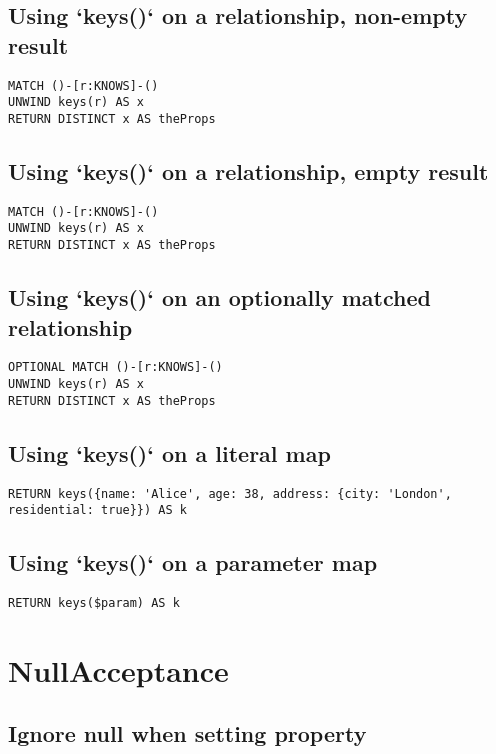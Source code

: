 \subsection{Using `keys()` on a relationship, non-empty result}

\begin{lstlisting}
MATCH ()-[r:KNOWS]-()
UNWIND keys(r) AS x
RETURN DISTINCT x AS theProps
\end{lstlisting}

\subsection{Using `keys()` on a relationship, empty result}

\begin{lstlisting}
MATCH ()-[r:KNOWS]-()
UNWIND keys(r) AS x
RETURN DISTINCT x AS theProps
\end{lstlisting}

\subsection{Using `keys()` on an optionally matched relationship}

\begin{lstlisting}
OPTIONAL MATCH ()-[r:KNOWS]-()
UNWIND keys(r) AS x
RETURN DISTINCT x AS theProps
\end{lstlisting}

\subsection{Using `keys()` on a literal map}

\begin{lstlisting}
RETURN keys({name: 'Alice', age: 38, address: {city: 'London', residential: true}}) AS k
\end{lstlisting}

\subsection{Using `keys()` on a parameter map}

\begin{lstlisting}
RETURN keys($param) AS k
\end{lstlisting}
\section{NullAcceptance}


\subsection{Ignore null when setting property}

